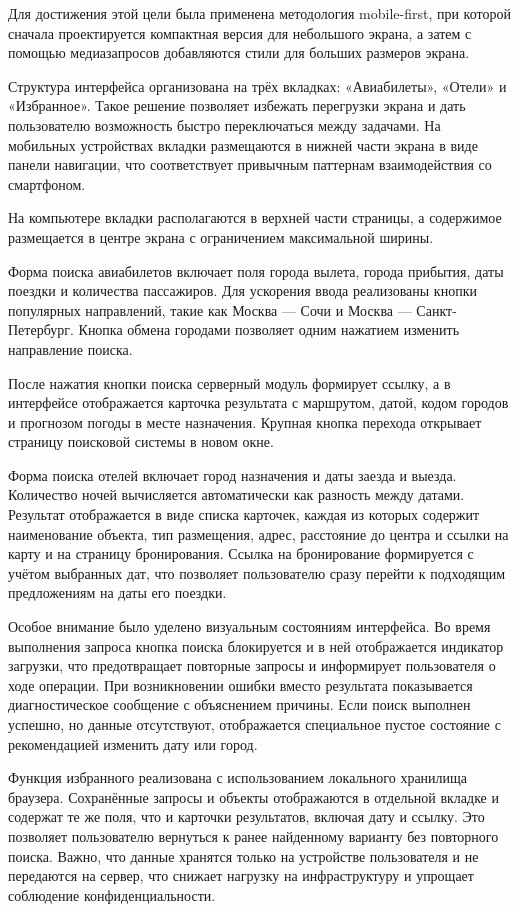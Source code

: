 \documentclass[14pt,a4paper,oneside]{extreport}
\begin{document}
Для достижения этой цели была применена методология mobile-first, при которой сначала проектируется компактная версия для небольшого экрана, а затем с помощью медиазапросов добавляются стили для больших размеров экрана.

Структура интерфейса организована на трёх вкладках: «Авиабилеты», «Отели» и «Избранное». Такое решение позволяет избежать перегрузки экрана и дать пользователю возможность быстро переключаться между задачами. На мобильных устройствах вкладки размещаются в нижней части экрана в виде панели навигации, что соответствует привычным паттернам взаимодействия со смартфоном.

На компьютере вкладки располагаются в верхней части страницы, а содержимое размещается в центре экрана с ограничением максимальной ширины.

Форма поиска авиабилетов включает поля города вылета, города прибытия, даты поездки и количества пассажиров. Для ускорения ввода реализованы кнопки популярных направлений, такие как Москва — Сочи и Москва — Санкт-Петербург. Кнопка обмена городами позволяет одним нажатием изменить направление поиска.

После нажатия кнопки поиска серверный модуль формирует ссылку, а в интерфейсе отображается карточка результата с маршрутом, датой, кодом городов и прогнозом погоды в месте назначения. Крупная кнопка перехода открывает страницу поисковой системы в новом окне.

Форма поиска отелей включает город назначения и даты заезда и выезда. Количество ночей вычисляется автоматически как разность между датами. Результат отображается в виде списка карточек, каждая из которых содержит наименование объекта, тип размещения, адрес, расстояние до центра и ссылки на карту и на страницу бронирования. Ссылка на бронирование формируется с учётом выбранных дат, что позволяет пользователю сразу перейти к подходящим предложениям на даты его поездки.

Особое внимание было уделено визуальным состояниям интерфейса. Во время выполнения запроса кнопка поиска блокируется и в ней отображается индикатор загрузки, что предотвращает повторные запросы и информирует пользователя о ходе операции. При возникновении ошибки вместо результата показывается диагностическое сообщение с объяснением причины. Если поиск выполнен успешно, но данные отсутствуют, отображается специальное пустое состояние с рекомендацией изменить дату или город.

Функция избранного реализована с использованием локального хранилища браузера. Сохранённые запросы и объекты отображаются в отдельной вкладке и содержат те же поля, что и карточки результатов, включая дату и ссылку. Это позволяет пользователю вернуться к ранее найденному варианту без повторного поиска. Важно, что данные хранятся только на устройстве пользователя и не передаются на сервер, что снижает нагрузку на инфраструктуру и упрощает соблюдение конфиденциальности.
\end{document}
